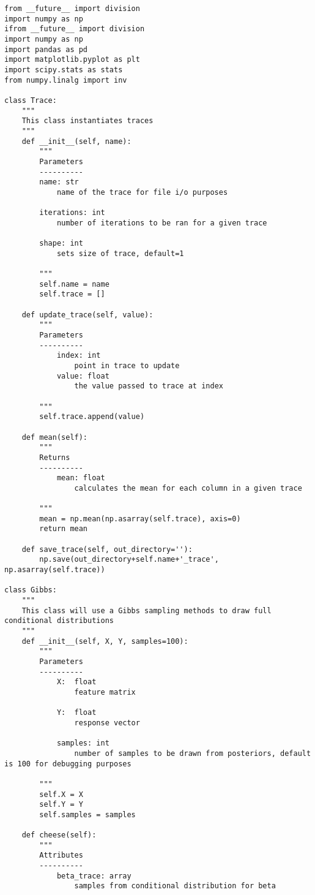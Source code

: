 \documentclass[11pt]{article}
\begin{document}
        \begin{lstlisting}
from __future__ import division
import numpy as np 
ifrom __future__ import division
import numpy as np 
import pandas as pd
import matplotlib.pyplot as plt
import scipy.stats as stats
from numpy.linalg import inv

class Trace:
    """
    This class instantiates traces
    """
    def __init__(self, name):
        """
        Parameters
        ----------
        name: str
            name of the trace for file i/o purposes

        iterations: int
            number of iterations to be ran for a given trace

        shape: int
            sets size of trace, default=1

        """
        self.name = name
        self.trace = []

    def update_trace(self, value):
        """
        Parameters
        ----------
            index: int
                point in trace to update
            value: float
                the value passed to trace at index

        """
        self.trace.append(value)

    def mean(self):
        """
        Returns
        ----------
            mean: float
                calculates the mean for each column in a given trace

        """
        mean = np.mean(np.asarray(self.trace), axis=0)
        return mean

    def save_trace(self, out_directory=''):
        np.save(out_directory+self.name+'_trace', np.asarray(self.trace))

class Gibbs:
    """
    This class will use a Gibbs sampling methods to draw full conditional distributions
    """
    def __init__(self, X, Y, samples=100):
        """
        Parameters
        ----------
            X:  float
                feature matrix

            Y:  float
                response vector

            samples: int
                number of samples to be drawn from posteriors, default is 100 for debugging purposes

        """
        self.X = X
        self.Y = Y
        self.samples = samples

    def cheese(self):
        """
        Attributes
        ----------
            beta_trace: array
                samples from conditional distribution for beta


\end{lstlisting}
\end{document}

